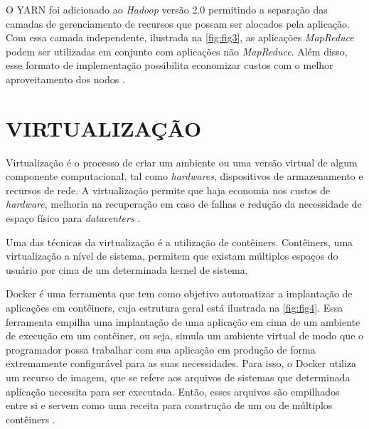 O YARN foi adicionado ao \textit{Hadoop} versão 2.0 permitindo a separação das camadas de gerenciamento de recursos que possam ser alocados pela aplicação. Com essa camada independente, ilustrada na \autoref{fig:fig3}, as aplicações \textit{MapReduce} podem ser utilizadas em conjunto com aplicações não \textit{MapReduce}. Além disso, esse formato de implementação possibilita economizar custos com o melhor aproveitamento dos nodos \cite{KobylinskaMartins14}. 


\newpage
\section{VIRTUALIZAÇÃO} \label{sec:virtualizacao}

Virtualização é o processo de criar um ambiente ou uma versão virtual de algum componente computacional, tal como \textit{hardwares}, dispositivos de armazenamento e recursos de rede. A virtualização permite que haja economia nos custos de \textit{hardware}, melhoria na recuperação em caso de falhas e redução da necessidade de espaço físico para \textit{datacenters} \cite{PortnoyVirtualization12}. 

Uma das técnicas da virtualização é a utilização de contêiners. Contêiners, uma virtualização a nível de sistema, permitem que existam múltiplos espaços do usuário por cima de um determinada kernel de sistema. 

\newpage
Docker é uma ferramenta que tem como objetivo automatizar a implantação de aplicações em contêiners, cuja estrutura geral está ilustrada na \autoref{fig:fig4}. Essa ferramenta empilha uma implantação de uma aplicação em cima de um ambiente de execução em um contêiner, ou seja, simula um ambiente virtual de modo que o programador possa trabalhar com sua aplicação em produção de forma extremamente configurável para as suas necessidades. Para isso, o Docker utiliza um recurso de imagem, que se refere aos arquivos de sistemas que determinada aplicação necessita para ser executada. Então, esses arquivos são empilhados entre si e servem como uma receita para construção de um ou de múltiplos contêiners \cite{DockerBook14}.

